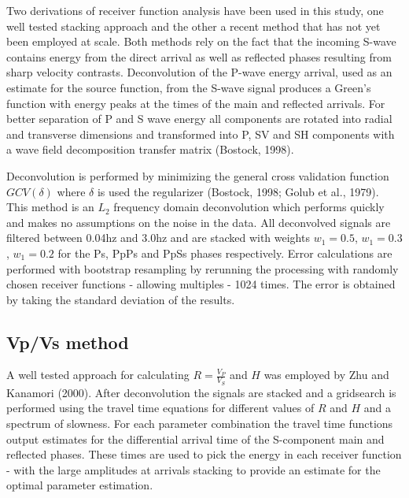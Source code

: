\documentclass[draft, 12pt]{article}
\begin{document}
 Two derivations of receiver function analysis have been used in this study, one well tested stacking approach and the other a recent method that has not yet been employed at scale. Both methods rely on the fact that the incoming S-wave contains energy from the direct arrival as well as reflected phases resulting from sharp velocity contrasts. Deconvolution of the P-wave energy arrival, used as an estimate for the source function, from the S-wave signal produces a Green's function with energy peaks at the times of the main and reflected arrivals. For better separation of P and S wave energy all components are rotated into radial and transverse dimensions and transformed into P, SV and SH components with a wave field decomposition transfer matrix (Bostock, 1998).


 Deconvolution is performed by minimizing the general cross validation function $GCV(\delta)$ where $\delta$ is used the regularizer (Bostock, 1998; Golub et al., 1979). This method is an $L_2$ frequency domain deconvolution which performs quickly and makes no assumptions on the noise in the data. All deconvolved signals are filtered between 0.04hz and 3.0hz and are stacked with weights $w_1=0.5$, $w_1=0.3$, $w_1=0.2$ for the Ps, PpPs and PpSs phases respectively. Error calculations are performed with bootstrap resampling by rerunning the processing with randomly chosen receiver functions - allowing multiples - 1024 times. The error is obtained by taking the standard deviation of the results.

\subsection{Vp/Vs method}
   A well tested approach for calculating $R=\frac{V_P}{V_S}$ and $H$ was employed by Zhu and Kanamori (2000). After deconvolution the signals are stacked and a gridsearch is performed using the travel time equations for different values of $R$ and $H$ and a spectrum of slowness. For each parameter combination the travel time functions output estimates for the differential arrival time of the S-component main and reflected phases. These times are used to pick the energy in each receiver function - with the large amplitudes at arrivals stacking to provide an estimate for the optimal parameter estimation.
\end{document}
